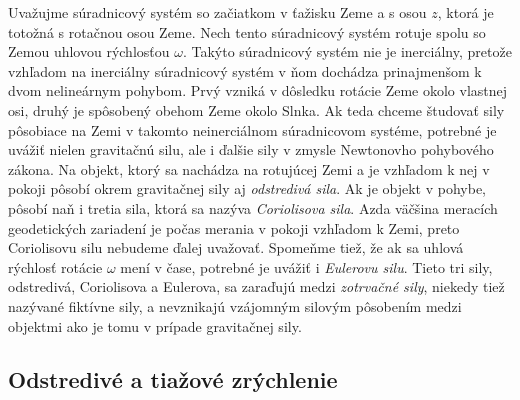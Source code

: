 \documentclass[a4paper, 12pt]{book}
\begin{document}
Uvažujme súradnicový systém so začiatkom v ťažisku Zeme a s osou $z$, ktorá je 
totožná s rotačnou osou Zeme.  Nech tento súradnicový systém rotuje spolu so 
Zemou uhlovou rýchlosťou $\omega$.  Takýto súradnicový systém nie je 
inerciálny, pretože vzhľadom na inerciálny súradnicový systém v ňom dochádza 
prinajmenšom k dvom nelineárnym pohybom.  Prvý vzniká v dôsledku rotácie Zeme 
okolo vlastnej osi, druhý je spôsobený obehom Zeme okolo Slnka.  Ak teda chceme 
študovať sily pôsobiace na Zemi v takomto neinerciálnom súradnicovom systéme, 
potrebné je uvážiť nielen gravitačnú silu, ale i ďalšie sily v zmysle 
Newtonovho pohybového zákona.  Na objekt, ktorý sa nachádza na rotujúcej Zemi 
a je vzhľadom k nej v pokoji pôsobí okrem gravitačnej sily aj \emph{odstredivá 
sila}.  Ak je objekt v pohybe, pôsobí naň i tretia sila, ktorá sa nazýva 
\emph{Coriolisova sila}.  Azda väčšina meracích geodetických zariadení je počas 
merania v pokoji vzhľadom k Zemi, preto Coriolisovu silu nebudeme ďalej 
uvažovať.  Spomeňme tiež, že ak sa uhlová rýchlosť rotácie $\omega$ mení 
v čase, potrebné je uvážiť i \emph{Eulerovu silu}.  Tieto tri sily, odstredivá, 
Coriolisova a Eulerova, sa zaraďujú medzi \emph{zotrvačné sily}, niekedy tiež 
nazývané fiktívne sily, a nevznikajú vzájomným silovým pôsobením medzi objektmi 
ako je tomu v prípade gravitačnej sily.






\subsection{Odstredivé a tiažové zrýchlenie}
\end{document}
